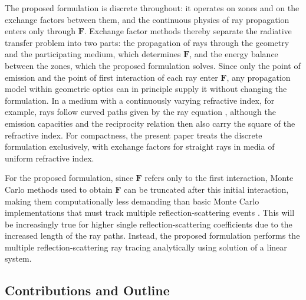 \documentclass[preprint,1p,times]{elsarticle}
\theoremstyle{plain}
\theoremstyle{definition}
\theoremstyle{remark}
\begin{document}
The proposed formulation is discrete throughout: it operates on zones and on the exchange factors between them, and the continuous physics of ray propagation enters only through $\mathbf{F}$. Exchange factor methods thereby separate the radiative transfer problem into two parts: the propagation of rays through the geometry and the participating medium, which determines $\mathbf{F}$, and the energy balance between the zones, which the proposed formulation solves. Since only the point of emission and the point of first interaction of each ray enter $\mathbf{F}$, any propagation model within geometric optics can in principle supply it without changing the formulation. In a medium with a continuously varying refractive index, for example, rays follow curved paths given by the ray equation \citep{BornWolfOptics1980}, although the emission capacities and the reciprocity relation then also carry the square of the refractive index. For compactness, the present paper treats the discrete formulation exclusively, with exchange factors for straight rays in media of uniform refractive index.

For the proposed formulation, since $\mathbf{F}$ refers only to the first interaction, Monte Carlo methods used to obtain $\mathbf{F}$ can be truncated after this initial interaction, making them computationally less demanding than basic Monte Carlo implementations that must track multiple reflection-scattering events \citep{MonteCarloPastFuture2021}. This will be increasingly true for higher single reflection-scattering coefficients due to the increased length of the ray paths. Instead, the proposed formulation performs the multiple reflection-scattering ray tracing analytically using solution of a linear system.

\subsection{Contributions and Outline}
\end{document}

